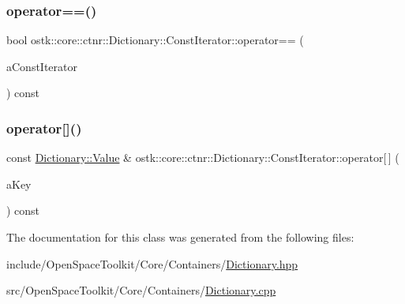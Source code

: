\mbox{\label{classostk_1_1core_1_1ctnr_1_1_dictionary_1_1_const_iterator_a6df9476c601d51a28a4a4b8c5d8ea0d0}} 
\subsubsection{\texorpdfstring{operator==()}{operator==()}}
{\footnotesize\ttfamily bool ostk\+::core\+::ctnr\+::\+Dictionary\+::\+Const\+Iterator\+::operator== (\begin{DoxyParamCaption}\item[{const \hyperlink{classostk_1_1core_1_1ctnr_1_1_dictionary_1_1_const_iterator}{Const\+Iterator} \&}]{a\+Const\+Iterator }\end{DoxyParamCaption}) const}

\mbox{\label{classostk_1_1core_1_1ctnr_1_1_dictionary_1_1_const_iterator_ae360562b0726a4c847d17530e6bcc7ee}} 
\subsubsection{\texorpdfstring{operator[]()}{operator[]()}}
{\footnotesize\ttfamily const \hyperlink{classostk_1_1core_1_1ctnr_1_1_dictionary_ace6ab82268031e972455affca8730c9c}{Dictionary\+::\+Value} \& ostk\+::core\+::ctnr\+::\+Dictionary\+::\+Const\+Iterator\+::operator\mbox{[}$\,$\mbox{]} (\begin{DoxyParamCaption}\item[{const \hyperlink{classostk_1_1core_1_1ctnr_1_1_dictionary_aa3b171525039535f342d271d27f90407}{Dictionary\+::\+Key} \&}]{a\+Key }\end{DoxyParamCaption}) const}



The documentation for this class was generated from the following files\+:\begin{DoxyCompactItemize}
\item 
include/\+Open\+Space\+Toolkit/\+Core/\+Containers/\hyperlink{_dictionary_8hpp}{Dictionary.\+hpp}\item 
src/\+Open\+Space\+Toolkit/\+Core/\+Containers/\hyperlink{_dictionary_8cpp}{Dictionary.\+cpp}\end{DoxyCompactItemize}

